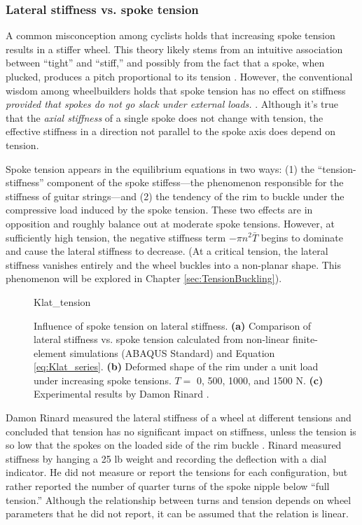 \documentclass[\rootdir/thesis.tex]{subfiles}
\begin{document}
\subsubsection{Lateral stiffness vs. spoke tension}

A common misconception among cyclists holds that increasing spoke tension results in a stiffer wheel. This theory likely stems from an intuitive association between ``tight'' and ``stiff,'' and possibly from the fact that a spoke, when plucked, produces a pitch proportional to its tension \cite{Allen1997}. However, the conventional wisdom among wheelbuilders holds that spoke tension has no effect on stiffness \emph{provided that spokes do not go slack under external loads.} \cite{Rinard,Kopecky2013,WheelFanatyk}. Although it's true that the \emph{axial stiffness} of a single spoke does not change with tension, the effective stiffness in a direction not parallel to the spoke axis does depend on tension.

Spoke tension appears in the equilibrium equations in two ways: (1) the ``tension-stiffness'' component of the spoke stiffess---the phenomenon responsible for the stiffness of guitar strings---and (2) the tendency of the rim to buckle under the compressive load induced by the spoke tension. These two effects are in opposition and roughly balance out at moderate spoke tensions. However, at sufficiently high tension, the negative stiffness term $-\pi n^2 \bar{T}$ begins to dominate and cause the lateral stiffness to decrease. (At a critical tension, the lateral stiffness vanishes entirely and the wheel buckles into a non-planar shape. This phenomenon will be explored in Chapter \ref{sec:TensionBuckling}).

\begin{figure}[h]
\centering
{Klat_tension}
\caption{Influence of spoke tension on lateral stiffness. \textbf{(a)} Comparison of lateral stiffness vs. spoke tension calculated from non-linear finite-element simulations (ABAQUS Standard) and Equation \eqref{eq:Klat_series}. \textbf{(b)} Deformed shape of the rim under a unit load under increasing spoke tensions. $T=\,\,$0, 500, 1000, and 1500 N. \textbf{(c)} Experimental results by Damon Rinard \cite{Rinard}.}
\label{fig:Klat_tension}
\end{figure}

Damon Rinard measured the lateral stiffness of a wheel at different tensions and concluded that tension has no significant impact on stiffness, unless the tension is so low that the spokes on the loaded side of the rim buckle \cite{Rinard}. Rinard measured stiffness by hanging a 25 lb weight and recording the deflection with a dial indicator. He did not measure or report the tensions for each configuration, but rather reported the number of quarter turns of the spoke nipple below ``full tension.'' Although the relationship between turns and tension depends on wheel parameters that he did not report, it can be assumed that the relation is linear.
\end{document}
